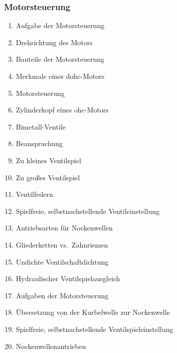 \subsubsection{Motorsteuerung}\label{motorsteuerung}

\begin{enumerate}
\item
  Aufgabe der Motorsteuerung\\
\item
  Drehrichtung des Motors\\
\item
  Bauteile der Motorsteuerung\\
\item
  Merkmale eines dohc-Motors\\
\item
  Motorsteuerung\\
\item
  Zylinderkopf eines ohc-Motors\\
\item
  Bimetall-Ventile\\
\item
  Beanspruchung\\
\item
  Zu kleines Ventilspiel\\
\item
  Zu großes Ventilspiel\\
\item
  Ventilfedern\\
\item
  Spielfreie, selbstnachstellende Ventileinstellung\\
\item
  Antriebsarten für Nockenwellen\\
\item
  Gliederketten vs.~Zahnriemen\\
\item
  Undichte Ventilschaftdichtung\\
\item
  Hydraulischer Ventilspielausgleich\\
\item
  Aufgaben der Motorsteuerung\\
\item
  Übersetzung von der Kurbelwelle zur Nockenwelle\\
\item
  Spielfreie, selbstnachstellende Ventilspieleinstellung\\
\item
  Nockenwellenantrieben
\end{enumerate}

